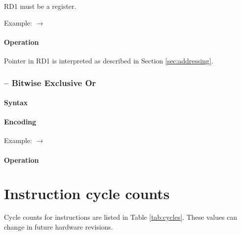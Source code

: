 \documentclass[a4paper,12pt,twoside,extrafontsizes]{memoir}
\begin{document}
{

RD1 must be a register.

Example:  $\rightarrow$ 

\subsubsection{Operation}


Pointer in RD1 is interpreted as described in Section \ref{sec:addressing}.

\subsection{ -- Bitwise Exclusive Or}
\label{subsec:instr:xor}

\subsubsection{Syntax}


\subsubsection{Encoding}


Example:  $\rightarrow$ 

\subsubsection{Operation}


}


\chapter{Instruction cycle counts}

Cycle counts for \lxp{} instructions are listed in Table \ref{tab:cycles}. These values can change in future hardware revisions.
\end{document}
